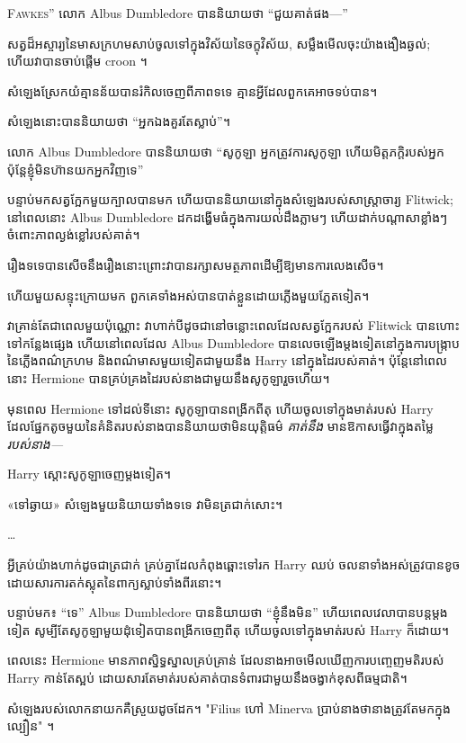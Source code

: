 
\lettrine[ante=“]{F}{awkes}” លោក Albus Dumbledore បាននិយាយថា “ជួយគាត់ផង—”

សត្វ​ដ៏​អស្ចារ្យ​នៃ​មាស​ក្រហម​សាប់​ចូល​ទៅ​ក្នុង​វិស័យ​នៃ​ចក្ខុ​វិស័យ, សម្លឹង​មើល​ចុះ​យ៉ាង​ងឿង​ឆ្ងល់; ហើយវាបានចាប់ផ្តើម croon ។

សំឡេង​ស្រែក​យំ​គ្មាន​ន័យ​បាន​រំកិល​ចេញ​ពី​ភាព​ទទេ គ្មាន​អ្វី​ដែល​ពួក​គេ​អាច​ទប់​បាន។

សំឡេង​នោះ​បាន​និយាយ​ថា “អ្នក​ឯង​គួរ​តែ​ស្លាប់”។

លោក Albus Dumbledore បាននិយាយថា “សូកូឡា អ្នកត្រូវការសូកូឡា ហើយមិត្តភក្តិរបស់អ្នក ប៉ុន្តែខ្ញុំមិនហ៊ានយកអ្នកវិញទេ”

បន្ទាប់មកសត្វក្អែកមួយក្បាលបានមក ហើយបាននិយាយនៅក្នុងសំឡេងរបស់សាស្រ្តាចារ្យ Flitwick; នៅពេលនោះ Albus Dumbledore ដកដង្ហើមធំក្នុងការយល់ដឹងភ្លាមៗ ហើយដាក់បណ្តាសាខ្លាំងៗចំពោះភាពល្ងង់ខ្លៅរបស់គាត់។

រឿង​ទទេ​បាន​សើច​នឹង​រឿង​នោះ​ព្រោះ​វា​បាន​រក្សា​សមត្ថភាព​ដើម្បី​ឱ្យ​មាន​ការ​លេង​សើច​។

ហើយ​មួយ​សន្ទុះ​ក្រោយ​មក ពួកគេ​ទាំង​អស់​បាន​បាត់​ខ្លួន​ដោយ​ភ្លើង​មួយ​ភ្លែត​ទៀត។

\later

វាគ្រាន់តែជាពេលមួយប៉ុណ្ណោះ វាហាក់បីដូចជានៅចន្លោះពេលដែលសត្វក្អែករបស់ Flitwick បានហោះទៅកន្លែងផ្សេង ហើយនៅពេលដែល Albus Dumbledore បានលេចឡើងម្តងទៀតនៅក្នុងការបង្ក្រាបនៃភ្លើងពណ៌ក្រហម និងពណ៌មាសមួយទៀតជាមួយនឹង Harry នៅក្នុងដៃរបស់គាត់។ ប៉ុន្តែនៅពេលនោះ Hermione បានគ្រប់គ្រងដៃរបស់នាងជាមួយនឹងសូកូឡារួចហើយ។

មុនពេល Hermione ទៅដល់ទីនោះ សូកូឡាបានពង្រីកពីតុ ហើយចូលទៅក្នុងមាត់របស់ Harry ដែលផ្នែកតូចមួយនៃគំនិតរបស់នាងបាននិយាយថាមិនយុត្តិធម៌ \emph{គាត់នឹង} មានឱកាសធ្វើវាក្នុងតម្លៃ \emph{របស់នាង— }

Harry ស្តោះសូកូឡាចេញម្តងទៀត។

«ទៅឆ្ងាយ» សំឡេងមួយនិយាយទាំងទទេ វាមិនត្រជាក់សោះ។

…

អ្វីគ្រប់យ៉ាងហាក់ដូចជាត្រជាក់ គ្រប់គ្នាដែលកំពុងឆ្ពោះទៅរក Harry ឈប់ ចលនាទាំងអស់ត្រូវបានខូចដោយសារការតក់ស្លុតនៃពាក្យស្លាប់ទាំងពីរនោះ។

បន្ទាប់មក៖ “ទេ” Albus Dumbledore បាននិយាយថា “ខ្ញុំនឹងមិន” ហើយពេលវេលាបានបន្តម្តងទៀត សូម្បីតែសូកូឡាមួយដុំទៀតបានពង្រីកចេញពីតុ ហើយចូលទៅក្នុងមាត់របស់ Harry ក៏ដោយ។

ពេលនេះ Hermione មានភាពស្និទ្ធស្នាលគ្រប់គ្រាន់ ដែលនាងអាចមើលឃើញការបញ្ចេញមតិរបស់ Harry កាន់តែស្អប់ ដោយសារតែមាត់របស់គាត់បានទំពារជាមួយនឹងចង្វាក់ខុសពីធម្មជាតិ។

សំឡេង​របស់​លោក​នាយក​គឺ​ស្រួយ​ដូច​ដែក។ "Filius ហៅ Minerva ប្រាប់នាងថានាងត្រូវតែមកក្នុងល្បឿន" ។

